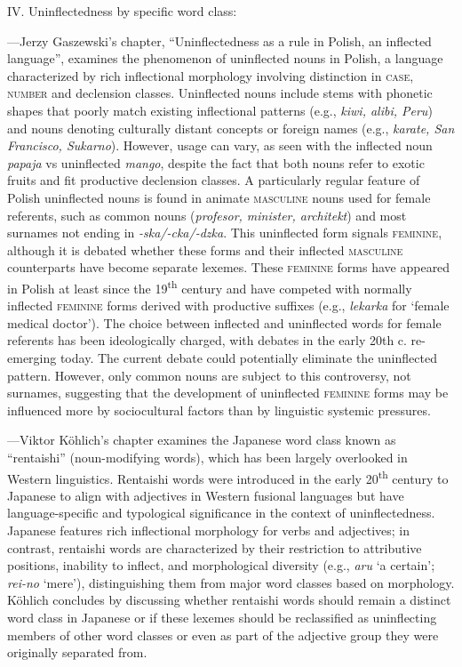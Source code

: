 \documentclass[output=paper]{langscibook}
\begin{document}
\medskip

\noindent IV. Uninflectedness by specific word class:

\medskip

---Jerzy Gaszewski's chapter, ``Uninflectedness as a rule in Polish, an inflected language'', examines the phenomenon of uninflected nouns in Polish, a language characterized by rich inflectional morphology involving distinction in \textsc{case}, \textsc{number} and declension classes. Uninflected nouns include stems with phonetic shapes that poorly match existing inflectional patterns (e.g., \emph{kiwi, alibi, Peru}) and nouns denoting culturally distant concepts or foreign names (e.g., \emph{karate, San Francisco, Sukarno}). However, usage can vary, as seen with the inflected noun \emph{papaja} vs uninflected \emph{mango}, despite the fact that both nouns refer to exotic fruits and fit productive declension classes. A particularly regular feature of Polish uninflected nouns is found in animate \textsc{masculine} nouns used for female referents, such as common nouns	(\emph{profesor, minister, architekt}) and most surnames not ending in \emph{-ska/-cka/-dzka}. This uninflected form signals \textsc{feminine}, although it is debated whether these forms and their inflected \textsc{masculine} counterparts have become separate lexemes. These \textsc{feminine} forms have appeared in Polish at least since the 19\textsuperscript{th} century and have competed with normally inflected \textsc{feminine} forms derived with productive suffixes (e.g., \emph{lekarka} for `female medical doctor'). The choice between inflected and uninflected words for female referents has been ideologically charged, with debates in the early 20th c. re-emerging today. The current debate could potentially eliminate the uninflected pattern. However, only common nouns are subject to this controversy, not surnames, suggesting that the development of uninflected \textsc{feminine} forms may be influenced more by sociocultural factors than by linguistic systemic pressures.

---Viktor Köhlich's chapter examines the Japanese word class known as ``rentaishi'' (noun-modifying words), which has been largely overlooked in Western linguistics. Rentaishi words were introduced in the early 20\textsuperscript{th} century to Japanese to align with adjectives in Western fusional languages but have language-specific and typological significance in the context of uninflectedness. Japanese features rich inflectional morphology for verbs and adjectives; in contrast, rentaishi words are characterized by their restriction to attributive positions, inability to inflect, and morphological diversity (e.g., \emph{aru} `a certain'; \emph{rei-no} `mere'), distinguishing them from major word classes based on morphology. Köhlich concludes by discussing whether rentaishi words should remain a distinct word class in Japanese or if these lexemes should be reclassified as uninflecting members of other word classes or even as part of the adjective group they were originally separated from.
\end{document}
